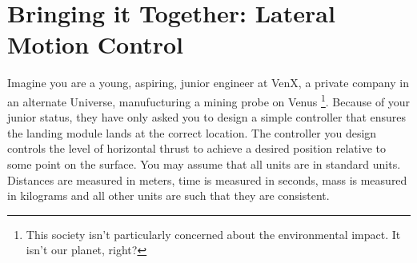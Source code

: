 \chapter{Bringing it Together: Lateral Motion Control}\label{Lab:3}
Imagine you are a young, aspiring, junior engineer at VenX, a private company in an alternate Universe, manufucturing a mining probe on Venus%
\footnote{This society isn't particularly concerned about the environmental impact. It isn't our planet, right?}.
Because of your junior status, they have only asked you to design a simple controller that ensures the landing module lands at the correct location.
The controller you design controls the level of horizontal thrust to achieve a desired position relative to some point on the surface.
You may assume that all units are in standard units.
Distances are measured in meters, time is measured in seconds, mass is measured in kilograms and all other units are such that they are consistent.

